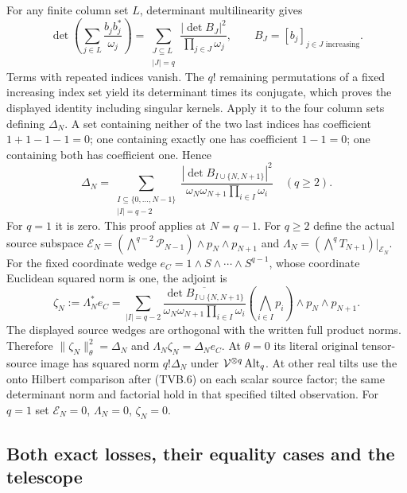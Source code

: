 For any finite column set $L$, determinant multilinearity gives
\[
 \det\left(\sum_{j\in L}\frac{b_jb_j^*}{\omega_j}\right)
 =\sum_{\substack{J\subseteq L\\|J|=q}}
       \frac{|\det B_J|^2}{\prod_{j\in J}\omega_j},
 \qquad B_J=[b_j]_{j\in J\text{ increasing}}.
\]
Terms with repeated indices vanish. The $q!$ remaining
permutations of a fixed increasing index set yield its determinant
times its conjugate, which proves the displayed identity including
singular kernels. Apply it to the four column sets defining
$\Delta_N$. A set containing neither of the two last indices has
coefficient $1+1-1-1=0$; one containing exactly one has coefficient
$1-1=0$; one containing both has coefficient one. Hence
\[
 \Delta_N=
 \sum_{\substack{I\subseteq\{0,\ldots,N-1\}\\|I|=q-2}}
 \frac{|\det B_{I\cup\{N,N+1\}}|^2}
      {\omega_N\omega_{N+1}\prod_{i\in I}\omega_i}
 \quad(q\ge2).
 \tag{TVB.30}
\]
For $q=1$ it is zero. This proof applies at $N=q-1$.
For $q\ge2$ define the actual source subspace
$\mathcal E_N=(\bigwedge^{q-2}\mathcal P_{N-1})\wedge p_N\wedge p_{N+1}$
and $\Lambda_N=(\bigwedge^qT_{N+1})|_{\mathcal E_N}$.
For the fixed coordinate wedge $e_C=1\wedge S\wedge\cdots\wedge S^{q-1}$,
whose coordinate Euclidean squared norm is one, the adjoint is
\[
 \zeta_N:=\Lambda_N^*e_C
 =\sum_{|I|=q-2}
 \frac{\overline{\det B_{I\cup\{N,N+1\}}}}
      {\omega_N\omega_{N+1}\prod_{i\in I}\omega_i}
 \left(\bigwedge_{i\in I}p_i\right)\wedge p_N\wedge p_{N+1}.
 \tag{TVB.31}
\]
The displayed source wedges are orthogonal with the written full
product norms. Therefore
$\|\zeta_N\|_\theta^2=\Delta_N$ and
$\Lambda_N\zeta_N=\Delta_Ne_C$.
At $\theta=0$ its literal original tensor-source image has squared
norm $q!\Delta_N$ under $\mathcal V^{\otimes q}\operatorname{Alt}_q$.
At other real tilts use the onto Hilbert comparison after (TVB.6)
on each scalar source factor; the same determinant norm and factorial
hold in that specified tilted observation. For $q=1$ set
$\mathcal E_N=0$, $\Lambda_N=0$, $\zeta_N=0$.

\subsection[\hspace{0.4em}Both exact losses, their equality cases and the telescope]{Both exact losses, their equality cases and the telescope}

